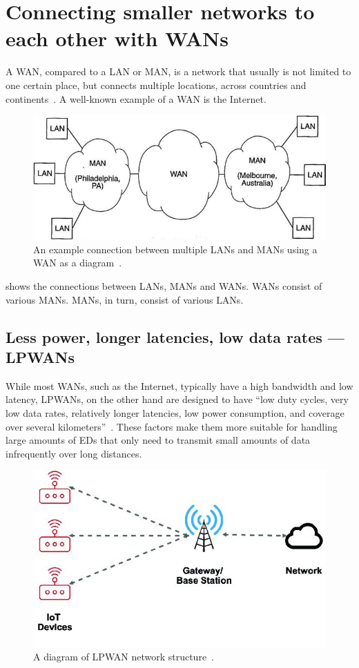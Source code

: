 \section{Connecting smaller networks to each other with \aclp{WAN}}

A \ac{WAN}, compared to a \acf{LAN} or \acf{MAN}, is a network that usually is not limited to one certain place, but connects multiple locations, across countries and continents~\cite[p. 2]{sadiku_fundamentals_2022}.
A well-known example of a \ac{WAN} is the Internet.

\begin{figure}[htbp]
    \centering
    \includegraphics[width=.6\textwidth]{pictures/lorawan-structure/wan_diagram.png}
    \caption[An example connection between multiple \aclp{LAN} and \aclp{MAN}.]{
        An example connection between multiple \acp{LAN} and \acp{MAN} using a \acf{WAN} as a diagram~\protect\cite{sadiku_fundamentals_2022}.
    }\label{pic:wan-diagram}
\end{figure}

 shows the connections between \acp{LAN}, \acp{MAN} and \acp{WAN}.
\acp{WAN} consist of various \acp{MAN}.
\acp{MAN}, in turn, consist of various \acp{LAN}.

\subsection{Less power, longer latencies, low data rates — \aclp{LPWAN}}

While most \acp{WAN}, such as the Internet, typically have a high bandwidth and low latency, \acp{LPWAN}, on the other hand are designed to have ``low duty cycles, very low data rates, relatively longer latencies, low power consumption, and coverage over several kilometers''~\cite[p. 289]{kumar_connecting_2023}.
These factors make them more suitable for handling large amounts of \aclp{ED} that only need to transmit small amounts of data infrequently over long distances.

\begin{figure}[htbp]
    \centering
    \includegraphics[width=.5\textwidth]{pictures/lorawan-structure/lpwan_network_structure.jpg}
    \caption[A diagram of \acl{LPWAN} network structure]{
        A diagram of \ac{LPWAN} network structure~\protect\cite{fernandez_assessing_2020}.
    }\label{pic:lpwan-diagram}
\end{figure}

